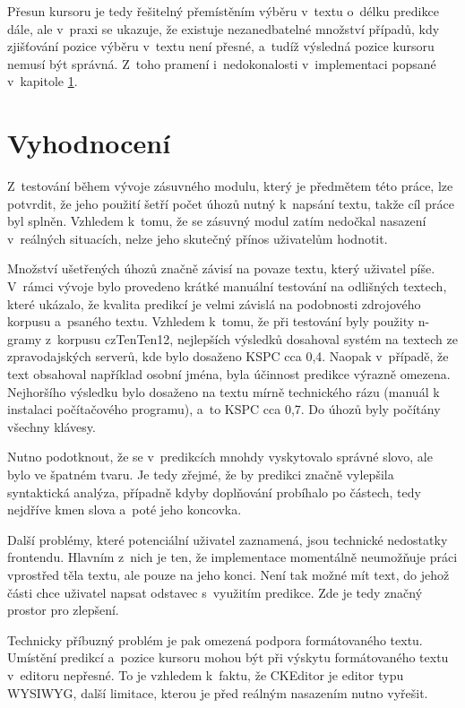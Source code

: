 \documentclass[a4paper,11pt,openany]{book} %
\begin{document}
Přesun kursoru je tedy řešitelný přemístěním výběru v~textu o~délku predikce dále, ale v~praxi se ukazuje, že existuje nezanedbatelné množství případů, kdy zjišťování pozice výběru v~textu není přesné, a~tudíž výsledná pozice kursoru nemusí být správná. Z~toho pramení i~nedokonalosti v~implementaci popsané v~kapitole \ref{vyhodnoceni}.

\chapter{Vyhodnocení}\label{vyhodnoceni}

Z~testování během vývoje zásuvného modulu, který je předmětem této práce, lze potvrdit, že jeho použití šetří počet úhozů nutný k~napsání textu, takže cíl práce byl splněn. Vzhledem k~tomu, že se zásuvný modul zatím nedočkal nasazení v~reálných situacích, nelze jeho skutečný přínos uživatelům hodnotit.

Množství ušetřených úhozů značně závisí na povaze textu, který uživatel píše. V~rámci vývoje bylo provedeno krátké manuální testování na odlišných textech, které ukázalo, že kvalita predikcí je velmi závislá na podobnosti zdrojového korpusu a~psaného textu. Vzhledem k~tomu, že při testování byly použity n-gramy z~korpusu czTenTen12, nejlepších výsledků dosahoval systém na textech ze zpravodajských serverů, kde bylo dosaženo KSPC cca 0,4. Naopak v~případě, že text obsahoval například osobní jména, byla účinnost predikce výrazně omezena. Nejhoršího výsledku bylo dosaženo na textu mírně technického rázu (manuál k instalaci počítačového programu), a~to KSPC cca 0,7. Do úhozů byly počítány všechny klávesy.

Nutno podotknout, že se v~predikcích mnohdy vyskytovalo správné slovo, ale bylo ve špatném tvaru. Je tedy zřejmé, že by predikci značně vylepšila syntaktická analýza, případně kdyby doplňování probíhalo po částech, tedy nejdříve kmen slova a~poté jeho koncovka.

Další problémy, které potenciální uživatel zaznamená, jsou technické nedostatky frontendu. Hlavním z~nich je ten, že implementace momentálně neumožňuje práci vprostřed těla textu, ale pouze na jeho konci. Není tak možné mít text, do jehož části chce uživatel napsat odstavec s~využitím predikce. Zde je tedy značný prostor pro zlepšení.

Technicky příbuzný problém je pak omezená podpora formátovaného textu. Umístění predikcí a~pozice kursoru mohou být při výskytu formátovaného textu v~editoru nepřesné. To je vzhledem k~faktu, že CKEditor je editor typu WYSIWYG, další limitace, kterou je před reálným nasazením nutno vyřešit.
\end{document}
